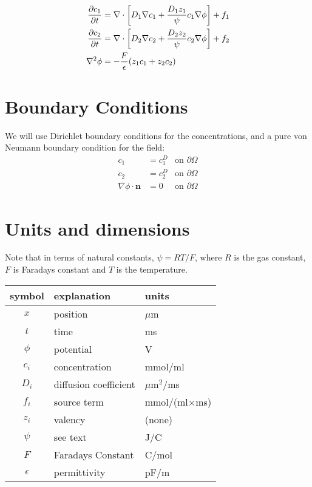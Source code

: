 \documentclass[12pt]{article}
\newcommand{\nvec}{\textbf{n}}
\begin{document}
\begin{align}
{\partial c_1 \over \partial t} & = \nabla \cdot \left[ D_1\nabla c_1 + {D_1z_1 \over \psi} c_1 \nabla \phi \right] + f_1 \\ 
{\partial c_2 \over \partial t} & = \nabla \cdot \left[ D_2\nabla c_2 + {D_2z_2 \over \psi} c_2 \nabla \phi\right] + f_2 \\ 
\nabla^2 \phi & =-{F \over \epsilon} (z_1c_1 + z_2c_2)\label{eq:phi}
\end{align}

\section{Boundary Conditions}

We will use Dirichlet boundary conditions for the concentrations, and a pure von Neumann boundary condition for the field: 
\begin{align}
c_1 & = c_1^D & \text{on } \partial \Omega \label{equ:c1}\\
c_2 & = c_2^D & \text{on } \partial \Omega \label{equ:c2}\\
\nabla \phi \cdot \nvec & = 0 & \text{on } \partial \Omega \label{equ:poisson} 
\end{align}

 
\section{Units and dimensions}
Note that in terms of natural constants, $\psi = RT/F$, where $R$ is the gas constant, $F$ is Faradays constant and $T$ is the temperature.
\begin{center}
 \begin{tabular}{c|l|l}
 symbol & explanation & units \\
 \hline
 $x$ & position & $\mu$m \\
 $t$ & time & ms \\
 $\phi$ & potential & V \\
 $c_i$ & concentration & mmol/ml \\ 
 $D_i$ & diffusion coefficient & $\mu$m$^2$/ms \\
 $f_i$ & source term & mmol/(ml$\times$ms) \\
 $z_i$ & valency & (none) \\
 $\psi$ & see text & J/C \\
 $F$ & Faradays Constant & C/mol \\
 $\epsilon$ & permittivity & pF/m \\
 \end{tabular}
 \end{center}
\end{document}
